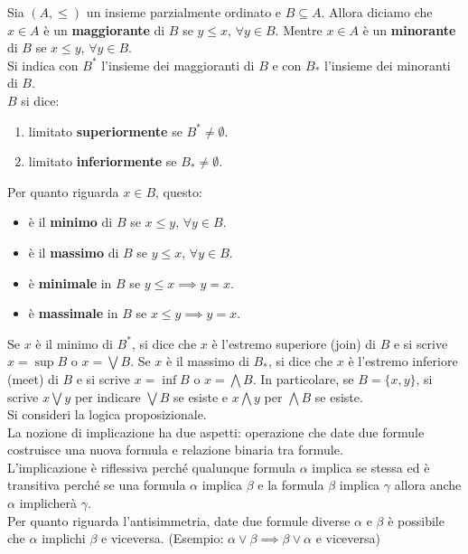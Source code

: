 Sia $(A, \leq)$ un insieme parzialmente ordinato e $B \subseteq A$. Allora diciamo che $x \in A$ è un \textbf{maggiorante} di $B$ se $y \leq x$, $\forall y \in B$. Mentre $x \in A$ è un \textbf{minorante} di $B$ se $x \leq y$, $\forall y \in B$.\\

Si indica con $B^*$ l’insieme dei maggioranti di $B$ e con $B_*$ l’insieme dei minoranti di $B$.\\
$B$ si dice:
\begin{enumerate}
    \item limitato \textbf{superiormente} se $B^* \neq \emptyset$. 
    \item limitato \textbf{inferiormente} se $B_* \neq \emptyset$.
\end{enumerate}

Per quanto riguarda \textbf{$x \in B$}, questo:
\begin{itemize}
    \item è il \textbf{minimo} di $B$ se $x \leq y$, $\forall y \in B$.
    \item è il \textbf{massimo} di $B$ se $y \leq x$, $\forall y \in B$.
    \item è \textbf{minimale} in $B$ se $y \leq x \implies y = x$.
    \item è \textbf{massimale} in $B$ se $x \leq y \implies y = x$.
\end{itemize}
 
Se $x$ è il minimo di $B^*$, si dice che $x$ è l’estremo superiore (join) di $B$ e si scrive $x = \sup B$ o $x = \bigvee B$. Se $x$ è il massimo di $B_*$, si dice che $x$ è l’estremo inferiore (meet) di $B$ e si scrive $x = \inf B$ o $x = \bigwedge B$. In particolare, se $B = \{x,y\}$, si scrive $x \bigvee y$ per indicare $\bigvee B$ se esiste e $x \bigwedge y$ per $\bigwedge B$ se esiste.\\

Si consideri la logica proposizionale.\\

La nozione di implicazione ha due aspetti: operazione che date due formule costruisce una nuova formula e relazione binaria tra formule.\\
L’implicazione è riflessiva perché qualunque formula $\alpha$ implica se stessa ed è transitiva perché se una formula $\alpha$ implica $\beta$ e la formula $\beta$ implica $\gamma$ allora anche $\alpha$ implicherà $\gamma$.\\

Per quanto riguarda l’antisimmetria, date due formule diverse $\alpha$ e $\beta$ è possibile che $\alpha$ implichi $\beta$ e viceversa. (Esempio: $\alpha \lor \beta \implies \beta \lor \alpha$ e viceversa)\\

